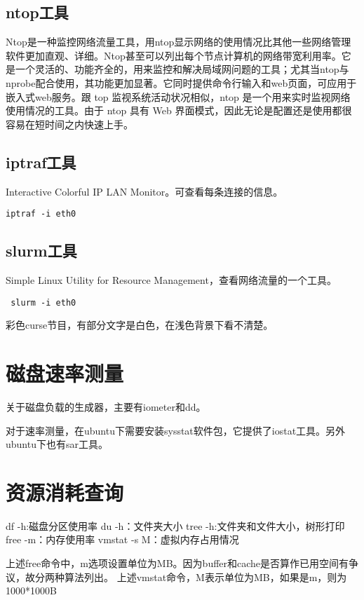 \subsection{ntop工具}
Ntop是一种监控网络流量工具，用ntop显示网络的使用情况比其他一些网络管理软件更加直观、详细。Ntop甚至可以列出每个节点计算机的网络带宽利用率。它是一个灵活的、功能齐全的，用来监控和解决局域网问题的工具；尤其当ntop与nprobe配合使用，其功能更加显著。它同时提供命令行输入和web页面，可应用于嵌入式web服务。跟 top 监视系统活动状况相似，ntop 是一个用来实时监视网络使用情况的工具。由于 ntop 具有 Web 界面模式，因此无论是配置还是使用都很容易在短时间之内快速上手。

\subsection{iptraf工具}
Interactive Colorful IP LAN Monitor。可查看每条连接的信息。
\begin{verbatim}
iptraf -i eth0
\end{verbatim}


\subsection{slurm工具}
 Simple Linux Utility for Resource Management，查看网络流量的一个工具。
 \begin{verbatim}
 slurm -i eth0
 \end{verbatim}

彩色curse节目，有部分文字是白色，在浅色背景下看不清楚。




\section{磁盘速率测量}
关于磁盘负载的生成器，主要有iometer和dd。

对于速率测量，在ubuntu下需要安装sysstat软件包，它提供了iostat工具。另外ubuntu下也有sar工具。
\section{资源消耗查询}
\begin{shellcmd}
 df -h:磁盘分区使用率
 du -h：文件夹大小
 tree -h:文件夹和文件大小，树形打印
 free -m：内存使用率
 vmstat -s M：虚拟内存占用情况
\end{shellcmd}
上述free命令中，m选项设置单位为MB。因为buffer和cache是否算作已用空间有争议，故分两种算法列出。
 上述vmstat命令，M表示单位为MB，如果是m，则为1000*1000B


